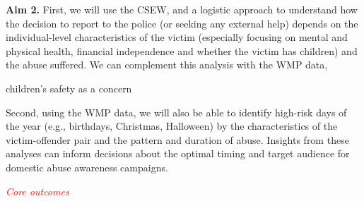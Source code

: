 \documentclass[11pt, a4paper]{article}
\begin{document}
\textbf{Aim 2.} First, we will use the CSEW, and a logistic approach to understand how the decision to report to the police (or seeking any external help) depends on the individual-level characteristics of the victim (especially focusing on mental and physical health, financial independence and whether the victim has children) and the abuse suffered. We can complement this analysis with the WMP data, 

children's safety as a concern

Second, using the WMP data, we will also be able to identify high-risk days of the year (e.g., birthdays, Christmas, Halloween) by the characteristics of the victim-offender pair and the pattern and duration of abuse. Insights from these analyses can inform decisions about the optimal timing and target audience for domestic abuse awareness campaigns. 


\textcolor{red}{\textit{Core outcomes}}








\end{document}
